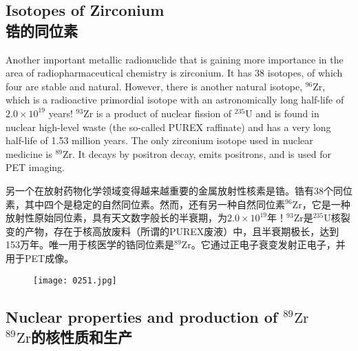 \documentclass[dvipsnames, svgnames,a4paper,11pt]{article}
\begin{document}
\subsection{Isotopes of Zirconium\\ 锆的同位素}  
Another important metallic radionuclide that is gaining more importance in the area of radiopharmaceutical chemistry is zirconium. It has 38 isotopes, of which four are stable and natural. However, there is another natural isotope, \(\mathrm{^{96}Zr}\), which is a radioactive primordial isotope with an astronomically long half-life of \(2.0 \times 10^{19}\) years! \(\mathrm{^{93}Zr}\) is a product of nuclear fission of \(\mathrm{^{235}U}\) and is found in nuclear high-level waste (the so-called PUREX raffinate) and has a very long half-life of 1.53 million years. The only zirconium isotope used in nuclear medicine is \(\mathrm{^{89}Zr}\). It decays by positron decay, emits positrons, and is used for PET imaging.

另一个在放射药物化学领域变得越来越重要的金属放射性核素是锆。锆有38个同位素，其中四个是稳定的自然同位素。然而，还有另一种自然同位素\(\mathrm{^{96}Zr}\)，它是一种放射性原始同位素，具有天文数字般长的半衰期，为\(2.0 \times 10^{19}\)年！\(\mathrm{^{93}Zr}\)是\(\mathrm{^{235}U}\)核裂变的产物，存在于核高放废料（所谓的PUREX废液）中，且半衰期极长，达到153万年。唯一用于核医学的锆同位素是\(\mathrm{^{89}Zr}\)。它通过正电子衰变发射正电子，并用于PET成像。

\begin{figure}[h]
	\centering
    \texttt{[image: 0251.jpg]}  
     \label{fig337}
\end{figure}

\subsection{Nuclear properties and production of \(\mathrm{{}^{89}Zr}\)\\ \(\mathrm{{}^{89}Zr}\)的核性质和生产}  
\end{document}

